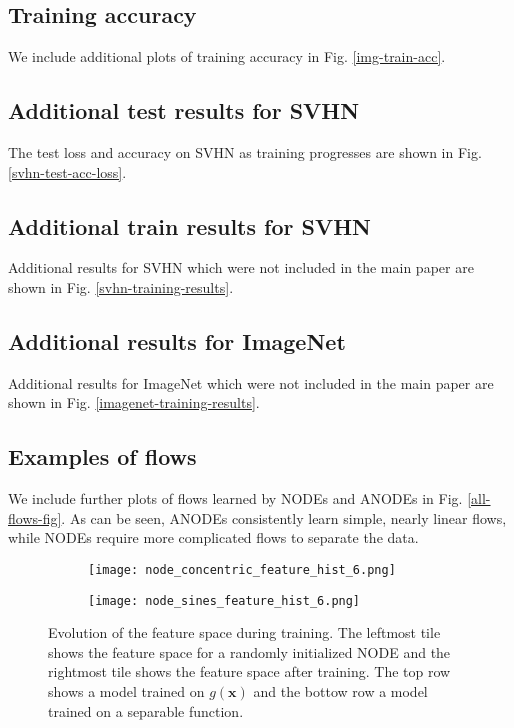\documentclass{article}
\begin{document}
\subsection{Training accuracy}

We include additional plots of training accuracy in Fig. \ref{img-train-acc}.

\subsection{Additional test results for SVHN}

The test loss and accuracy on SVHN as training progresses are shown in Fig. \ref{svhn-test-acc-loss}.

\subsection{Additional train results for SVHN}

Additional results for SVHN which were not included in the main paper are shown in Fig. \ref{svhn-training-results}.

\subsection{Additional results for ImageNet}

Additional results for ImageNet which were not included in the main paper are shown in Fig. \ref{imagenet-training-results}.

\subsection{Examples of flows}

We include further plots of flows learned by NODEs and ANODEs in Fig. \ref{all-flows-fig}. As can be seen, ANODEs consistently learn simple, nearly linear flows, while NODEs require more complicated flows to separate the data.

\begin{figure}[t]
\centering
\begin{subfigure}[t]{0.8\linewidth}
\centering
\texttt{[image: node\_concentric\_feature\_hist\_6.png]}
\end{subfigure}
\begin{subfigure}[t]{0.8\linewidth}
\centering
\texttt{[image: node\_sines\_feature\_hist\_6.png]}
\end{subfigure}
\caption{Evolution of the feature space during training. The leftmost tile shows the feature space for a randomly initialized NODE and the rightmost tile shows the feature space after training. The top row shows a model trained on $g(\mathbf{x})$ and the bottow row a model trained on a separable function.}
\label{feature-space-evolution}
\end{figure}
\end{document}
